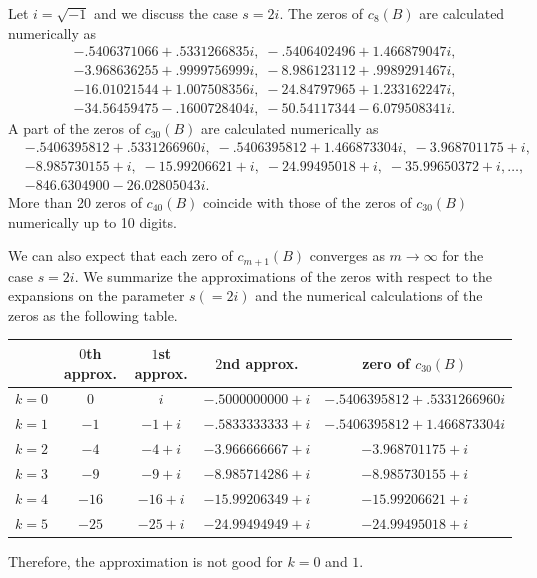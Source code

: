 \documentclass[12pt]{amsart}
\numberwithin{equation}{section}
\theoremstyle{definition}
\theoremstyle{remark}
\begin{document}
Let $i = \sqrt{-1}$ and we discuss the case $s=2i$.
The zeros of $c_{8} (B)$ are calculated numerically as
\begin{align*}
& -.5406371066+.5331266835 i , \; -.5406402496+1.466879047 i, \\
& -3.968636255+.9999756999 i, \; -8.986123112+.9989291467 i, \\
& -16.01021544+1.007508356 i , \; -24.84797965+1.233162247 i , \\
& -34.56459475-.1600728404 i , \; -50.54117344-6.079508341 i .
\end{align*}
A part of the zeros of $c_{30} (B)$ are calculated numerically as
\begin{align*}
& -.5406395812+.5331266960 i , \; -.5406395812+1.466873304 i , \; -3.968701175+ i, \\ 
& -8.985730155+i , \; -15.99206621+i , \; -24.99495018+i , \; -35.99650372+i , \dots , \\
& -846.6304900-26.02805043 i .
\end{align*}
More than 20 zeros of $c_{40} (B)$ coincide with those of the zeros of $c_{30} (B)$ numerically up to 10 digits.

We can also expect that each zero of $c_{m+1} (B)$ converges as $m \to \infty $ for the case $s=2i$.
We summarize the approximations of the zeros with respect to the expansions on the parameter $s(=2i)$ and the numerical calculations of the zeros as the following table.
\begin{center}
\begin{tabular}{c|c|c|c|c}
& $0$th approx. & $1$st approx. & $2$nd approx. & zero of $ c_{30} (B) $ \\ \hline
$k=0$ & $0$ & $i $ & $-.5000000000+i $ & $ -.5406395812+.5331266960 i$ \\
$k=1$ & $-1$ & $-1 + i $ & $-.5833333333+i $ & $-.5406395812+1.466873304 i$ \\
$k=2$ & $-4$ & $-4 + i $ & $-3.966666667+i $ & $-3.968701175+ i$ \\
$k=3$ & $-9$ & $-9 + i $ & $-8.985714286+i $ & $-8.985730155+i$ \\
$k=4$ & $-16$ & $-16 + i $ & $-15.99206349+i $ & $-15.99206621+i$ \\
$k=5$ & $-25$ & $-25 + i $ & $-24.99494949+i $ & $-24.99495018+i$
\end{tabular}
\end{center}
Therefore, the approximation is not good for $k=0$ and $1$.
\end{document}

